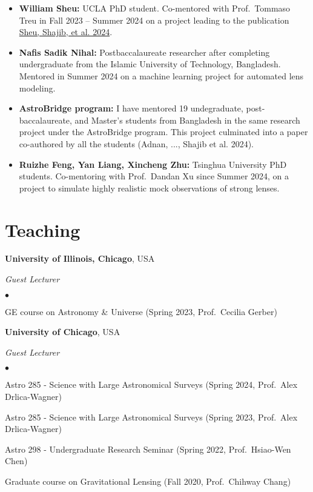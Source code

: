 \documentclass[margin, line]{res}
\newenvironment{list2}{
  \begin{list}{$\bullet$}{%
      \setlength{\itemsep}{0in}
      \setlength{\parsep}{0in} \setlength{\parskip}{0in}
      \setlength{\topsep}{0in} \setlength{\partopsep}{0in} 
      \setlength{\leftmargin}{0.2in}}}{\end{list}}
\begin{document}
\begin{resume}
\begin{itemize}
	\item \textbf{William Sheu:} UCLA PhD student. Co-mentored with Prof.~Tommaso Treu in Fall 2023 -- Summer 2024 on a project leading to the publication \href{https://ui.adsabs.harvard.edu/abs/2024arXiv240810316S/abstract}{Sheu, Shajib, et al. 2024}.
	\item \textbf{Nafis Sadik Nihal:} Postbaccalaureate researcher after completing undergraduate from the Islamic University of Technology, Bangladesh. Mentored in Summer 2024 on a machine learning project for automated lens modeling.
	\item \textbf{AstroBridge program:} I have mentored 19 undegraduate, post-baccalaureate, and Master's students from Bangladesh in the same research project under the AstroBridge program. This project culminated into a paper co-authored by all the students (Adnan, ..., Shajib et al. 2024).
	\item \textbf{Ruizhe Feng, Yan Liang, Xincheng Zhu:} Tsinghua University PhD students. Co-mentoring with Prof.~Dandan Xu since Summer 2024, on a project to simulate highly realistic mock observations of strong lenses.
\end{itemize}


\section{\sc Teaching}

{\bf University of Illinois, Chicago}, USA

{\em Guest Lecturer} \hfill {\bf}\\
\begin{list2}
	\item GE course on Astronomy \& Universe (Spring 2023, Prof.~Cecilia Gerber)
\end{list2}

{\bf University of Chicago}, USA

{\em Guest Lecturer} \hfill {\bf}\\
\begin{list2}
	\item Astro 285 - Science with Large Astronomical Surveys (Spring 2024, Prof.~Alex Drlica-Wagner)
	\item Astro 285 - Science with Large Astronomical Surveys (Spring 2023, Prof.~Alex Drlica-Wagner)
	\item Astro 298 - Undergraduate Research Seminar (Spring 2022, Prof.~Hsiao-Wen Chen)
 	\item Graduate course on Gravitational Lensing (Fall 2020, Prof.~Chihway Chang)
\end{list2}
	

\end{resume}
\end{document}
